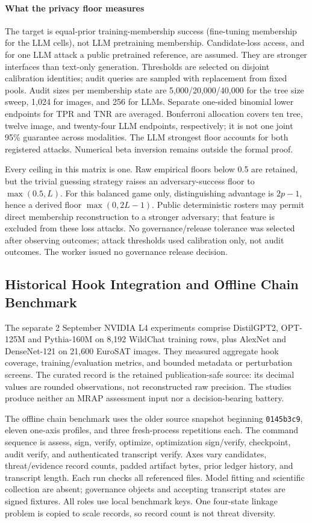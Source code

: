 \documentclass[conference,compsoc]{IEEEtran}
\newcommand{\code}[1]{\texttt{\small #1}}
\begin{document}
\paragraph{What the privacy floor measures}
The target is equal-prior training-membership success (fine-tuning membership
for the LLM cells), not LLM pretraining membership. Candidate-loss access, and
for one LLM attack a public pretrained
reference, are assumed. They are stronger interfaces than text-only generation.
Thresholds are selected on disjoint calibration identities; audit queries are
sampled with replacement from fixed pools. Audit sizes per membership state
are 5,000/20,000/40,000 for the tree size sweep, 1,024 for images, and 256 for
LLMs. Separate one-sided binomial lower endpoints for TPR and TNR are averaged.
Bonferroni allocation covers ten tree, twelve image, and twenty-four LLM
endpoints, respectively; it is not one joint 95\% guarantee across modalities.
The LLM strongest floor accounts for both registered attacks. Numerical beta
inversion remains outside the formal proof.

Every ceiling in this matrix is one. Raw empirical floors below 0.5 are
retained, but the trivial guessing strategy raises an adversary-success floor
to $\max(0.5,L)$. For this balanced game only, distinguishing advantage is
$2p-1$, hence a derived floor $\max(0,2L-1)$. Public deterministic rosters may
permit direct membership reconstruction to a stronger adversary; that feature
is excluded from these loss attacks. No governance/release tolerance was selected
after observing outcomes; attack thresholds used calibration only, not audit
outcomes. The worker issued no governance release decision.

\subsection{Historical Hook Integration and Offline Chain Benchmark}
The separate 2 September NVIDIA L4 experiments comprise DistilGPT2,
OPT-125M and Pythia-160M on 8,192 WildChat training rows, plus AlexNet and
DenseNet-121 on 21,600 EuroSAT images. They measured aggregate hook coverage,
training/evaluation metrics, and bounded metadata or perturbation screens.
The curated record is the retained publication-safe source: its decimal values
are rounded observations, not reconstructed raw precision. The studies produce
neither an MRAP assessment input nor a decision-bearing battery.

The offline chain benchmark uses the older source snapshot beginning
\code{0145b3c9}, eleven one-axis profiles, and three fresh-process repetitions
each. The command sequence is assess, sign, verify, optimize, optimization
sign/verify, checkpoint, audit verify, and authenticated transcript verify.
Axes vary candidates, threat/evidence record counts, padded artifact bytes,
prior ledger history, and transcript length. Each run checks all referenced
files. Model fitting and scientific collection are absent; governance objects
and accepting transcript states are signed fixtures. All roles use local
benchmark keys. One four-state linkage problem is copied to scale records,
so record count is not threat diversity.
\end{document}
